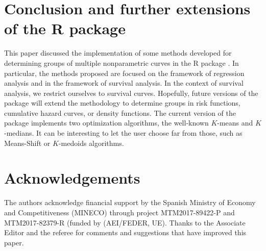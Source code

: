 \section*{Conclusion and further extensions of the R package}


This paper discussed the implementation of some methods developed for determining groups of multiple nonparametric curves in the R package . In particular, the methods proposed are focused on the framework of regression analysis and in the framework of survival analysis. In the context of survival analysis, we restrict ourselves to survival curves. Hopefully, future versions of the package will extend the methodology to determine groups in risk functions, cumulative hazard curves, or density functions. The current version of the package implements two optimization algorithms, the well-known $K$-means and $K$-medians. It can be interesting to let the user choose far from those, such as Means-Shift or $K$-medoids algorithms.




\section*{Acknowledgements}

The authors acknowledge financial support by the Spanish Ministry of Economy and Competitiveness (MINECO) through project MTM2017-89422-P and MTM2017-82379-R (funded by (AEI/FEDER, UE). Thanks to the Associate Editor and the referee for comments and suggestions that have improved this paper.
\break


\address{Nora M. Villanueva\\
Department of Statistics and OR,\\
SiDOR research group \& CINBIO\\
University of Vigo, Spain\\
ORCiD: 0000-0001-8085-2745\\
\url{http://noramvillanueva.github.io}\\
}



